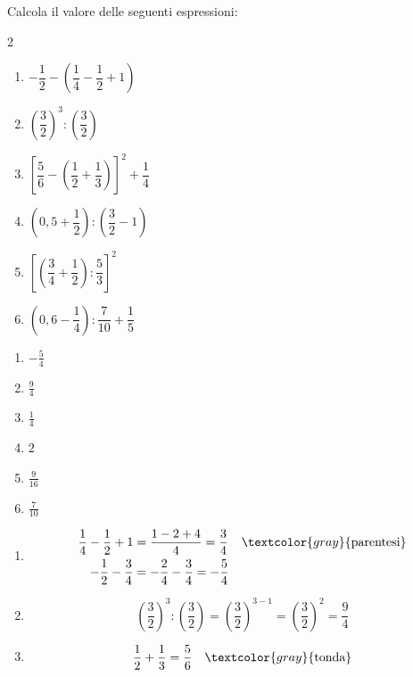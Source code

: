 \begin{question}[ID=2.2, subtitle={Calcolo di espressioni frazionarie — serie 2}, tags={espressioni, frazionarie}, difficulty=media]
Calcola il valore delle seguenti espressioni:
\begin{multicols}{2}
\begin{enumerate}[leftmargin=3.2cm]
    \item $-\dfrac{1}{2}-\left(\dfrac{1}{4}-\dfrac{1}{2}+1\right)$
    \item $\left(\dfrac{3}{2}\right)^3:\left(\dfrac{3}{2}\right)$
    \item $\left[\dfrac{5}{6}-\left(\dfrac{1}{2}+\dfrac{1}{3}\right)\right]^2+\dfrac{1}{4}$
    \item $\left(0{,}5+\dfrac{1}{2}\right):\left(\dfrac{3}{2}-1\right)$
    \item $\left[\left(\dfrac{3}{4}+\dfrac{1}{2}\right):\dfrac{5}{3}\right]^2$
    \item $\left(0{,}6-\dfrac{1}{4}\right):\dfrac{7}{10}+\dfrac{1}{5}$
\end{enumerate}
\end{multicols}
\begin{solution}
\begin{enumerate}
    \item $-\tfrac54$
    \item $\tfrac94$
    \item $\tfrac14$
    \item $2$
    \item $\tfrac{9}{16}$
    \item $\tfrac{7}{10}$
\end{enumerate}
\end{solution}
\begin{explanation}
\begin{enumerate}
    \item \[\begin{aligned}
    \dfrac14-\dfrac12+1 &= \dfrac{1-2+4}{4}=\dfrac34 && \textcolor{gray}{\text{parentesi}}\\
    -\dfrac12-\dfrac34 &= -\dfrac24-\dfrac34=-\dfrac54
    \end{aligned}\]
    \item \[ \left(\dfrac32\right)^3:\left(\dfrac32\right)=\left(\dfrac32\right)^{3-1}=\left(\dfrac32\right)^2=\dfrac94 \]
    \item \[\begin{aligned}
    \dfrac12+\dfrac13 &= \dfrac56 && \textcolor{gray}{\text{tonda}}\\

\end{aligned}\]
\end{enumerate}
\end{explanation}
\end{question}

